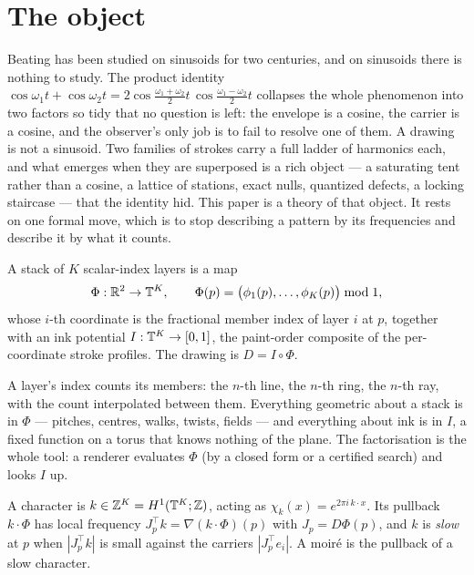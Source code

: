 \section{The object}
\label{sec:object}

Beating has been studied on sinusoids for two centuries, and on sinusoids
there is nothing to study. The product identity
$\cos\omega_1t+\cos\omega_2t=2\cos\tfrac{\omega_1+\omega_2}2t\,\cos\tfrac{\omega_1-\omega_2}2t$
collapses the whole phenomenon into two factors so tidy that no question is
left: the envelope is a cosine, the carrier is a cosine, and the observer's
only job is to fail to resolve one of them. A drawing is not a sinusoid. Two
families of strokes carry a full ladder of harmonics each, and what emerges
when they are superposed is a rich object --- a saturating tent rather than a
cosine, a lattice of stations, exact nulls, quantized defects, a locking
staircase --- that the identity hid. This paper is a theory of that object.
It rests on one formal move, which is to stop describing a pattern by its
frequencies and describe it by what it counts.

\begin{definition}
\label{def:drawing}
A stack of $K$ scalar-index layers is a map
\[
  \Phi:\mathbb{R}^2\to\mathbb{T}^K,\qquad \Phi(p)=\big(\phi_1(p),\dots,\phi_K(p)\big)\bmod 1,
\]
whose $i$-th coordinate is the fractional member index of layer $i$ at $p$,
together with an ink potential $I:\mathbb{T}^K\to[0,1]$, the paint-order composite
of the per-coordinate stroke profiles. The drawing is $D=I\circ\Phi$.
\end{definition}

A layer's index counts its members: the $n$-th line, the $n$-th ring, the
$n$-th ray, with the count interpolated between them. Everything geometric
about a stack is in $\Phi$ --- pitches, centres, walks, twists, fields ---
and everything about ink is in $I$, a fixed function on a torus that knows
nothing of the plane. The factorisation is the whole tool: a renderer
evaluates $\Phi$ (by a closed form or a certified search) and looks $I$ up.

\begin{definition}
\label{def:character}
A character is $k\in\mathbb{Z}^K=H^1(\mathbb{T}^K;\mathbb{Z})$, acting as $\chi_k(x)=e^{2\pi i\,k\cdot x}$.
Its pullback $k\cdot\Phi$ has local frequency $J_p^{\top}k=\nabla(k\cdot\Phi)(p)$
with $J_p=D\Phi(p)$, and $k$ is \emph{slow} at $p$ when $|J_p^{\top}k|$ is small
against the carriers $|J_p^{\top}e_i|$. A moir\'e is the pullback of a slow
character.
\end{definition}

